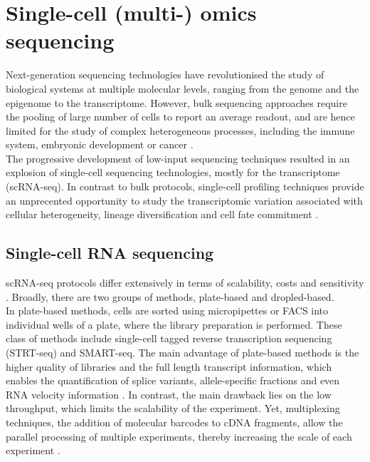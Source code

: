 \chapter{Single-cell (multi-) omics sequencing}

\graphicspath{{Chapter1/Figs/}}

Next-generation sequencing technologies have revolutionised the study of biological systems at multiple molecular levels, ranging from the genome\cite{Fleischmann1995} and the epigenome\cite{Frommer1992} to the transcriptome\cite{Lister2008,Bainbridge2006,Nagalakshmi2008,Mortazavi2008}. However, bulk sequencing approaches require the pooling of large number of cells to report an average readout, and are hence limited for the study of complex heterogeneous processes, including the immune system, embryonic development or cancer \cite{Griffiths2018,Papalexi2018,Patel2014}.\\
The progressive development of low-input sequencing techniques resulted in an explosion of single-cell sequencing technologies, mostly for the transcriptome (scRNA-seq). In contrast to bulk protocols, single-cell profiling techniques provide an unprecented opportunity to study the transcriptomic variation associated with cellular heterogeneity, lineage diversification and cell fate commitment \cite{Kolodziejczyk2015}.

\section{Single-cell RNA sequencing}
scRNA-seq protocols differ extensively in terms of scalability, costs and sensitivity \cite{Svensson2018, Lafzy2018}. Broadly, there are two groups of methods, plate-based and dropled-based.\\
In plate-based methods, cells are sorted using micropipettes or FACS into individual wells of a plate, where the library preparation is performed. These class of methods include single-cell tagged reverse transcription sequencing (STRT-seq\cite{Islam2011}) and SMART-seq\cite{Ramskold2012, Picelli2014}. The main advantage of plate-based methods is the higher quality of libraries and the full length transcript information, which enables the quantification of splice variants\cite{Huang2017}, allele-specific fractions\cite{Deng2014} and even RNA velocity information \cite{LaManno2018}. In contrast, the main drawback lies on the low throughput, which limits the scalability of the experiment. Yet, multiplexing techniques, the addition of molecular barcodes to cDNA fragments, allow the parallel processing of multiple experiments, thereby increasing the scale of each experiment \cite{Hashimshony2012}. \\
	
